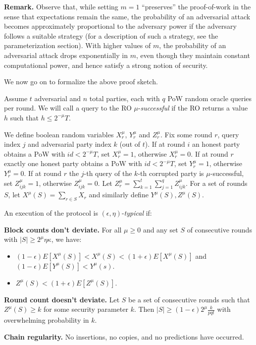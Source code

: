 \noindent\textbf{Remark.}
Observe that, while setting $m = 1$ ``preserves'' the proof-of-work in the sense
that expectations remain the same, the probability of an adversarial attack
becomes approximately proportional to the adversary power if the adversary
follows a suitable strategy (for a description of such a strategy, see the
parameterization section). With higher values of $m$, the probability of an
adversarial attack drops exponentially in $m$, even though they maintain
constant computational power, and hence satisfy a strong notion of security.

We now go on to formalize the above proof sketch.

Assume $t$ adversarial and $n$ total parties, each with $q$
PoW random oracle queries per round. We will call a query to the
RO $\mu$-\textit{successful} if the RO returns a value $h$
such that $h \leq 2^{-\mu}T$.

We define boolean random variables $X_r^\mu$, $Y_r^\mu$ and $Z_r^\mu$. Fix some
round $r$, query index $j$ and adversarial party index $k$ (out of $t$). If at
round $i$ an honest party obtains a PoW with $id < 2^{-\mu}T$, set $X_r^\mu =
1$, otherwise $X_r^\mu = 0$. If at round $r$ exactly one honest party obtains a
PoW with $id < 2^{-\mu}T$, set $Y_r^\mu = 1$, otherwise $Y_r^\mu = 0$. If at
round $r$ the $j$-th query of the $k$-th corrupted party is $\mu$-successful,
set $Z^\mu_{ijk} = 1$, otherwise $Z^\mu_{ijk} = 0$. Let $Z^\mu_r = \sum_{k=1}^t
\sum_{j=1}^q Z^\mu_{ijk}$. For a set of rounds $S$, let $X^\mu(S) = \sum_{r \in
S} X_r$ and similarly define $Y^\mu(S), Z^\mu(S)$.

\begin{definition}
    An execution of the protocol is $(\epsilon, \eta)$-\textit{typical} if:

    \textnormal{\bf Block counts don't deviate.}
    For all $\mu \geq 0$ and any set $S$ of consecutive rounds
    with $|S| \geq 2^\mu \eta\kappa$, we have:

    \begin{itemize}
        \item $(1 - \epsilon)E[X^\mu(S)] < X^\mu(S) < (1 + \epsilon)E[X^\mu(S)]$ and $(1 - \epsilon)E[Y^\mu(S)] < Y^\mu(s)$.
        \item $Z^\mu(S) < (1 + \epsilon)E[Z^\mu(S)]$.
    \end{itemize}

    \textnormal{\bf Round count doesn't deviate.}
    Let $S$ be a set of consecutive rounds such that $Z^\mu(S)
    \geq k$ for some security parameter $k$. Then $|S| \geq (1 -
    \epsilon)2^\mu\frac{k}{pqt}$ with overwhelming probability in $k$.

    \textnormal{\bf Chain regularity.}
    No insertions, no copies, and no predictions \cite{backbone} have occurred.
\end{definition}

